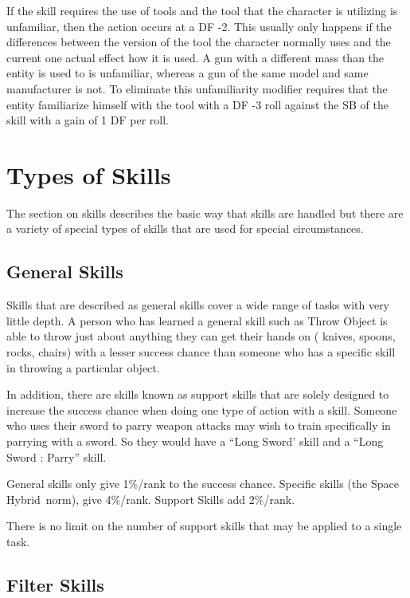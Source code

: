 If the skill requires the use of tools and the tool that the character is
utilizing is unfamiliar, then the action occurs at a DF -2. This usually
only happens if the differences between the version of the tool the
character normally uses and the current one actual effect how it is
used. A gun with a different mass than the entity is used to is
unfamiliar, whereas a gun of the same model and same manufacturer is
not. To eliminate this unfamiliarity modifier requires that the entity
familiarize himself with the tool with a DF -3 roll against the SB of 
the skill with a gain of 1 DF per roll. 

\section{Types of Skills}

The section on skills describes the basic way that skills are 
handled but there are a variety of special types of skills that are 
used for special circumstances.

\subsection{General Skills}

Skills that are described as general skills cover a wide range of
tasks with very little depth. A person who has learned a general 
skill such as Throw Object is able to throw just about anything they 
can get their hands on ( knives, spoons, rocks, chairs) with a lesser 
success chance than someone who has a specific skill in throwing a
particular object.

In addition, there are skills known as support skills that are solely
designed to increase the success chance when doing one type of action 
with a skill. Someone who uses their sword to parry weapon attacks 
may wish to train specifically in parrying with a sword. So they 
would have a ``Long Sword' skill and a ``Long Sword : Parry'' skill.

General skills only give 1\%/rank to the success chance. Specific 
skills (the Space Hybrid\ norm), give 4\%/rank. Support Skills add 2\%/rank.

There is no limit on the number of support skills that may be applied to
a single task.

\subsection{Filter Skills}

